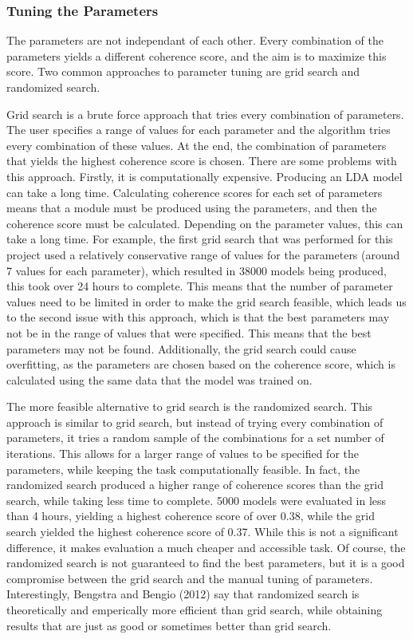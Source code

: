 \subsubsection*{Tuning the Parameters}

The parameters are not independant of each other. Every combination of the parameters yields a different coherence score, and the aim is to maximize this score. Two common approaches to parameter tuning are grid search and randomized search. 

Grid search is a brute force approach that tries every combination of parameters. The user specifies a range of values for each parameter and the algorithm tries every combination of these values. At the end, the combination of parameters that yields the highest coherence score is chosen. There are some problems with this approach. Firstly, it is computationally expensive. Producing an LDA model can take a long time. Calculating coherence scores for each set of parameters means that a module must be produced using the parameters, and then the coherence score must be calculated. Depending on the parameter values, this can take a long time. For example, the first grid search that was performed for this project used a relatively conservative range of values for the parameters (around 7 values for each parameter), which resulted in 38000 models being produced, this took over 24 hours to complete. This means that the number of parameter values need to be limited in order to make the grid search feasible, which leads us to the second issue with this approach, which is that the best parameters may not be in the range of values that were specified. This means that the best parameters may not be found. Additionally, the grid search could cause overfitting, as the parameters are chosen based on the coherence score, which is calculated using the same data that the model was trained on.

The more feasible alternative to grid search is the randomized search. This approach is similar to grid search, but instead of trying every combination of parameters, it tries a random sample of the combinations for a set number of iterations. This allows for a larger range of values to be specified for the parameters, while keeping the task computationally feasible. In fact, the randomized search produced a higher range of coherence scores than the grid search, while taking less time to complete. 5000 models were evaluated in less than 4 hours, yielding a highest coherence score of over 0.38, while the grid search yielded the highest coherence score of 0.37. While this is not a significant difference, it makes evaluation a much cheaper and accessible task. Of course, the randomized search is not guaranteed to find the best parameters, but it is a good compromise between the grid search and the manual tuning of parameters. Interestingly, Bengstra and Bengio (2012) say that randomized search is theoretically and emperically more efficient than grid search, while obtaining results that are just as good or sometimes better than grid search.~\cite{bergstra2012random}